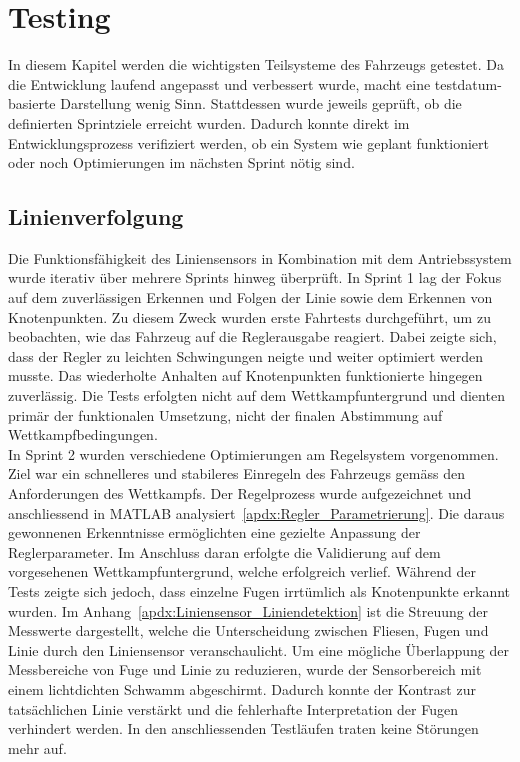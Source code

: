 \documentclass[main.tex]{subfiles} %
\begin{document}

\section{Testing}
In diesem Kapitel werden die wichtigsten Teilsysteme des Fahrzeugs getestet. Da die Entwicklung laufend angepasst und verbessert wurde,
macht eine testdatum-basierte Darstellung wenig Sinn. Stattdessen wurde jeweils geprüft, ob die definierten Sprintziele erreicht wurden.
Dadurch konnte direkt im Entwicklungsprozess verifiziert werden, ob ein System wie geplant funktioniert oder noch Optimierungen im nächsten
Sprint nötig sind.

\subsection*{Linienverfolgung}
Die Funktionsfähigkeit des Liniensensors in Kombination mit dem Antriebssystem wurde iterativ über mehrere Sprints hinweg überprüft.
In Sprint 1 lag der Fokus auf dem zuverlässigen Erkennen und Folgen der Linie sowie dem Erkennen von Knotenpunkten. Zu diesem Zweck
wurden erste Fahrtests durchgeführt, um zu beobachten, wie das Fahrzeug auf die Reglerausgabe reagiert. Dabei zeigte sich, dass der
Regler zu leichten Schwingungen neigte und weiter optimiert werden musste. Das wiederholte Anhalten auf Knotenpunkten funktionierte
hingegen zuverlässig. Die Tests erfolgten nicht auf dem Wettkampfuntergrund und dienten primär der funktionalen Umsetzung, nicht
der finalen Abstimmung auf Wettkampfbedingungen.\\
In Sprint 2 wurden verschiedene Optimierungen am Regelsystem vorgenommen. Ziel war ein schnelleres und stabileres Einregeln des Fahrzeugs
gemäss den Anforderungen des Wettkampfs. Der Regelprozess wurde aufgezeichnet und anschliessend in MATLAB analysiert~\ref{apdx:Regler_Parametrierung}.
Die daraus gewonnenen Erkenntnisse ermöglichten eine gezielte Anpassung der Reglerparameter. Im Anschluss daran erfolgte die Validierung auf
dem vorgesehenen Wettkampfuntergrund, welche erfolgreich verlief.
Während der Tests zeigte sich jedoch, dass einzelne Fugen irrtümlich als Knotenpunkte erkannt wurden. Im Anhang~\ref{apdx:Liniensensor_Liniendetektion}
ist die Streuung der Messwerte dargestellt, welche die Unterscheidung zwischen Fliesen, Fugen und Linie durch den Liniensensor veranschaulicht.
Um eine mögliche Überlappung der Messbereiche von Fuge und Linie zu reduzieren, wurde der Sensorbereich mit einem lichtdichten Schwamm abgeschirmt.
Dadurch konnte der Kontrast zur tatsächlichen Linie verstärkt und die fehlerhafte Interpretation der Fugen verhindert werden. In den anschliessenden
Testläufen traten keine Störungen mehr auf.
\end{document}
